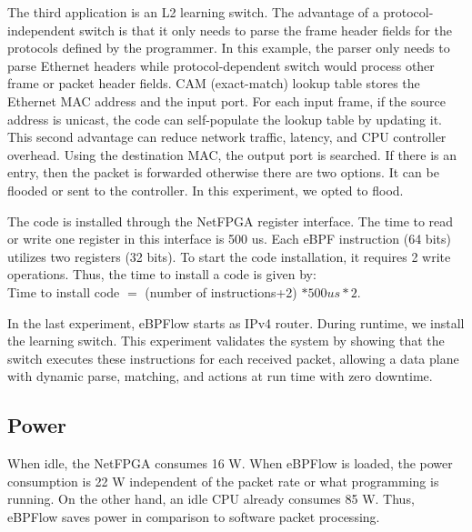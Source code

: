 The third application is an L2 learning switch.
The advantage of a protocol-independent switch is that it only needs to parse the frame header fields for the protocols defined by the programmer. In this example, the parser only needs to parse Ethernet headers while protocol-dependent switch would process other frame or packet header fields. CAM (exact-match) lookup table stores the Ethernet MAC address and the input port. 
For each input frame, if the source address is unicast, the code can self-populate the lookup table by updating it.
This second advantage can reduce network traffic, latency, and CPU controller overhead.
Using the destination MAC, the output port is searched.
If there is an entry, then the packet is forwarded otherwise there are two options. It can be flooded or sent to the controller. In this experiment, we opted to flood.


The code is installed through the NetFPGA register interface.
The time to read or write one register in this interface is 500 us.
Each eBPF instruction (64 bits) utilizes two registers (32 bits).
To start the code installation, it requires 2 write operations.
Thus, the time to install a code is given by:\\
Time to install code $=$ (number of instructions+2) $* 500 us * 2.$ 

In the last experiment, eBPFlow starts as IPv4 router. During runtime, we install the learning switch. This experiment validates the system by showing that the switch executes these instructions for each received packet, allowing a data plane with dynamic parse, matching, and actions at run time with zero downtime.

\subsection{Power}

When idle, the NetFPGA consumes 16 W.
When eBPFlow is loaded, the power consumption is 22 W independent of the packet rate or what programming is running.
On the other hand, an idle CPU already consumes 85 W.
Thus, eBPFlow saves power in comparison to software packet processing.



